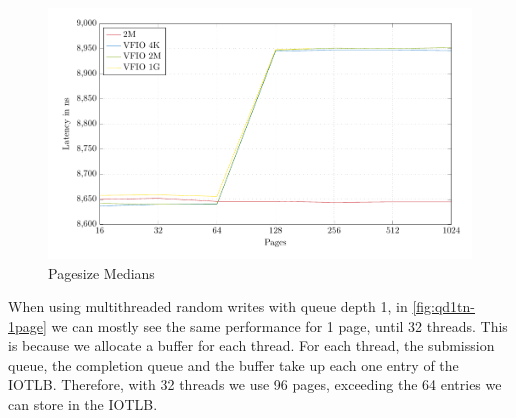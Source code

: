 \begin{figure}
    \centering
    \includegraphics[width=\textwidth]{figures/psmeds}
    \caption{Pagesize Medians}
    \label{fig:med-ps}
\end{figure}

When using multithreaded random writes with queue depth 1, in \autoref{fig:qd1tn-1page} we can mostly see the same performance for 1 page, until 32 threads. This is because we allocate a buffer for each thread. For each thread, the submission queue, the completion queue and the buffer take up each one entry of the IOTLB. Therefore, with 32 threads we use 96 pages, exceeding the 64 entries we can store in the IOTLB.

